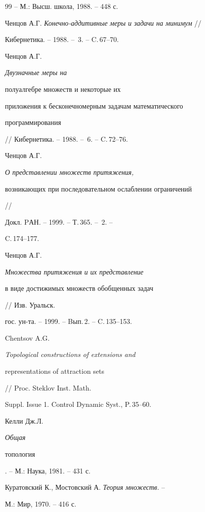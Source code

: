 \begin{thebibliography}{99}
-- М.: Высш. школа, 1988. -- 448 с.





 Ченцов А.Г. {\em Конечно-аддитивные меры и задачи на минимум} //


Кибернетика. -- 1988. -- \No\,3. -- C.\,67--70.





 Ченцов А.Г. {\em Двузначные меры на


полуалгебре множеств и некоторые их


приложения к бесконечномерным задачам математического


программирования} // Кибернетика. -- 1988. -- \No\,6. -- C.\,72--76.





 Ченцов А.Г. {\em О представлении множеств притяжения,


возникающих при последовательном ослаблении ограничений} //


Докл. PАН. -- 1999. -- Т.\,365. -- \No\,2. --


C.\,174--177.





 Ченцов А.Г. {\em Множества притяжения и их представление


в виде достижимых множеств обобщенных задач} // Изв. Уральск.


гос. ун-та. -- 1999. -- Bып.\,2. -- C.\,135--153.







Chentsov A.G. {\em Topological constructions of extensions and


representations of attraction sets} // Proc. Steklov Inst. Math.


Suppl. Issue 1. Control Dynamic Syst., P.\,35--60.





 Келли Дж.Л. {\em Общая


топология}. -- М.: Наука, 1981. -- 431 с.





 Куратовский К., Мостовский А. {\em Теория множеств}. --


М.: Мир, 1970. -- 416 с.






\end{thebibliography}
